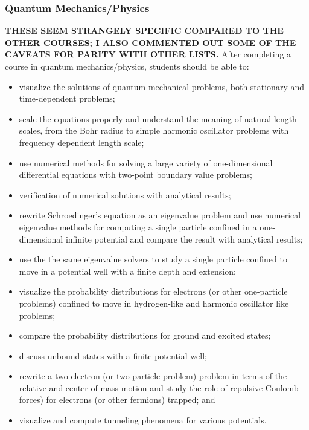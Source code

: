 \documentclass[graybox,envcountchap,sectrefs]{svmult}
\begin{document}
\subsubsection{Quantum Mechanics/Physics}
{\bf THESE SEEM STRANGELY SPECIFIC COMPARED TO THE OTHER COURSES; I ALSO COMMENTED OUT SOME OF THE CAVEATS FOR PARITY WITH OTHER LISTS.}
After completing a course in quantum mechanics/physics, students should be able to:
\begin{itemize}
\item visualize the solutions of quantum mechanical problems, both stationary and time-dependent problems;

\item scale the equations properly and understand the meaning of natural length scales, from the Bohr radius to simple harmonic oscillator problems with frequency dependent length scale; %

\item use numerical methods for solving a large variety of one-dimensional differential equations with two-point boundary value problems;%

\item verification of numerical solutions with analytical results;%

\item rewrite Schroedinger's equation as an eigenvalue problem and use numerical eigenvalue methods for computing a single particle confined in a one-dimensional infinite potential and compare the result with analytical results; %

\item use the the same eigenvalue solvers to study a single particle confined to move in a potential well with a finite depth and extension;%

\item visualize the probability distributions for electrons (or other one-particle problems) confined to move in hydrogen-like and harmonic oscillator like problems;
\item compare the probability distributions for ground and excited states;
\item discuss unbound states with a finite potential well;


\item rewrite a two-electron (or two-particle problem) problem in terms of the relative and center-of-mass motion and study the role of repulsive Coulomb forces) for electrons (or other fermions) trapped; and

\item visualize and compute tunneling phenomena for various potentials.

\end{itemize}
\end{document}
